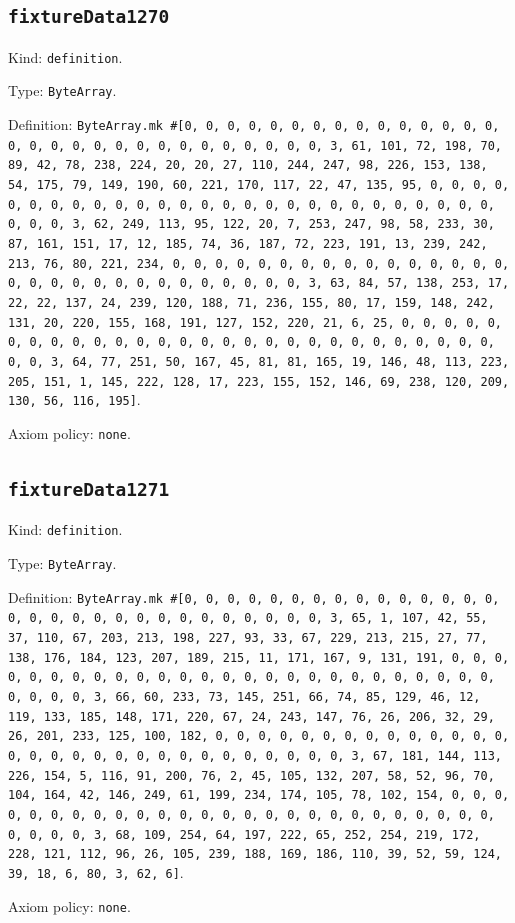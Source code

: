 \documentclass[11pt]{article}
\begin{document}
\subsection*{\texttt{fixtureData1270}}
\noindent Kind: \texttt{definition}.\par
\noindent Type: \texttt{ByteArray}.\par
\noindent Definition: \texttt{ByteArray.mk \#[0, 0, 0, 0, 0, 0, 0, 0, 0, 0, 0, 0, 0, 0, 0, 0, 0, 0, 0, 0, 0, 0, 0, 0, 0, 0, 0, 0, 0, 0, 3, 61, 101, 72, 198, 70, 89, 42, 78, 238, 224, 20, 20, 27, 110, 244, 247, 98, 226, 153, 138, 54, 175, 79, 149, 190, 60, 221, 170, 117, 22, 47, 135, 95, 0, 0, 0, 0, 0, 0, 0, 0, 0, 0, 0, 0, 0, 0, 0, 0, 0, 0, 0, 0, 0, 0, 0, 0, 0, 0, 0, 0, 0, 0, 3, 62, 249, 113, 95, 122, 20, 7, 253, 247, 98, 58, 233, 30, 87, 161, 151, 17, 12, 185, 74, 36, 187, 72, 223, 191, 13, 239, 242, 213, 76, 80, 221, 234, 0, 0, 0, 0, 0, 0, 0, 0, 0, 0, 0, 0, 0, 0, 0, 0, 0, 0, 0, 0, 0, 0, 0, 0, 0, 0, 0, 0, 0, 0, 3, 63, 84, 57, 138, 253, 17, 22, 22, 137, 24, 239, 120, 188, 71, 236, 155, 80, 17, 159, 148, 242, 131, 20, 220, 155, 168, 191, 127, 152, 220, 21, 6, 25, 0, 0, 0, 0, 0, 0, 0, 0, 0, 0, 0, 0, 0, 0, 0, 0, 0, 0, 0, 0, 0, 0, 0, 0, 0, 0, 0, 0, 0, 0, 3, 64, 77, 251, 50, 167, 45, 81, 81, 165, 19, 146, 48, 113, 223, 205, 151, 1, 145, 222, 128, 17, 223, 155, 152, 146, 69, 238, 120, 209, 130, 56, 116, 195]}.\par
\noindent Axiom policy: \texttt{none}.\par
\subsection*{\texttt{fixtureData1271}}
\noindent Kind: \texttt{definition}.\par
\noindent Type: \texttt{ByteArray}.\par
\noindent Definition: \texttt{ByteArray.mk \#[0, 0, 0, 0, 0, 0, 0, 0, 0, 0, 0, 0, 0, 0, 0, 0, 0, 0, 0, 0, 0, 0, 0, 0, 0, 0, 0, 0, 0, 0, 3, 65, 1, 107, 42, 55, 37, 110, 67, 203, 213, 198, 227, 93, 33, 67, 229, 213, 215, 27, 77, 138, 176, 184, 123, 207, 189, 215, 11, 171, 167, 9, 131, 191, 0, 0, 0, 0, 0, 0, 0, 0, 0, 0, 0, 0, 0, 0, 0, 0, 0, 0, 0, 0, 0, 0, 0, 0, 0, 0, 0, 0, 0, 0, 3, 66, 60, 233, 73, 145, 251, 66, 74, 85, 129, 46, 12, 119, 133, 185, 148, 171, 220, 67, 24, 243, 147, 76, 26, 206, 32, 29, 26, 201, 233, 125, 100, 182, 0, 0, 0, 0, 0, 0, 0, 0, 0, 0, 0, 0, 0, 0, 0, 0, 0, 0, 0, 0, 0, 0, 0, 0, 0, 0, 0, 0, 0, 0, 3, 67, 181, 144, 113, 226, 154, 5, 116, 91, 200, 76, 2, 45, 105, 132, 207, 58, 52, 96, 70, 104, 164, 42, 146, 249, 61, 199, 234, 174, 105, 78, 102, 154, 0, 0, 0, 0, 0, 0, 0, 0, 0, 0, 0, 0, 0, 0, 0, 0, 0, 0, 0, 0, 0, 0, 0, 0, 0, 0, 0, 0, 0, 0, 3, 68, 109, 254, 64, 197, 222, 65, 252, 254, 219, 172, 228, 121, 112, 96, 26, 105, 239, 188, 169, 186, 110, 39, 52, 59, 124, 39, 18, 6, 80, 3, 62, 6]}.\par
\noindent Axiom policy: \texttt{none}.\par
\end{document}
